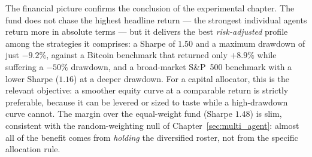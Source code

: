\begin{table}[h!]
    \centering
    \caption{Financial comparison on the unified two-year OOS window (1 June 2024 -- 31 May 2026), net of fees. The fund attains the strongest risk-adjusted profile --- the highest Sharpe and Sortino and the smallest drawdown among the active strategies.}
    \label{tab:strategy_comparison}
\end{table}

\vspace{2mm}

The financial picture confirms the conclusion of the experimental chapter. The fund does not chase the highest headline return --- the strongest individual agents return more in absolute terms --- but it delivers the best \textit{risk-adjusted} profile among the strategies it comprises: a Sharpe of $1.50$ and a maximum drawdown of just $-9.2\%$, against a Bitcoin benchmark that returned only $+8.9\%$ while suffering a $-50\%$ drawdown, and a broad-market S\&P~500 benchmark with a lower Sharpe ($1.16$) at a deeper drawdown. For a capital allocator, this is the relevant objective: a smoother equity curve at a comparable return is strictly preferable, because it can be levered or sized to taste while a high-drawdown curve cannot. The margin over the equal-weight fund (Sharpe $1.48$) is slim, consistent with the random-weighting null of Chapter~\ref{sec:multi_agent}: almost all of the benefit comes from \textit{holding} the diversified roster, not from the specific allocation rule.

